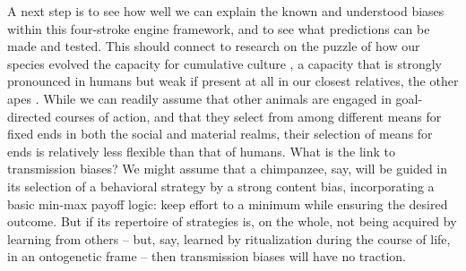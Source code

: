 A next step is to see how well we can explain the known and understood biases 
within this four-stroke engine framework, and to see what predictions can be made and tested. This should connect to research 
on the puzzle of how our species evolved the capacity for cumulative 
culture \citep{tomasello_cultural_1999}, a capacity that is strongly pronounced in humans but weak 
if present at all in our closest relatives, the other apes \citep{herrmann_humans_2007}. While we can readily assume that other animals are 
engaged in goal-directed courses of action, and that they select from 
among different means for fixed ends in both the social and material 
realms, their selection of means for ends is relatively less flexible 
than that of humans. What is the link to transmission biases? We might assume that a chimpanzee, say, will be guided in its selection 
of a behavioral strategy by a strong content bias, incorporating a 
basic min-max payoff logic: keep effort to a minimum while ensuring the desired outcome. But if its repertoire of strategies is, on 
the whole, not being acquired by learning from others -- but, say, learned by ritualization during the course of life, in an ontogenetic frame -- then transmission 
biases will have no traction. 







 

\newpage
